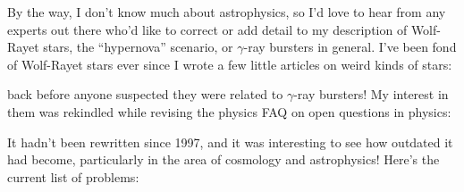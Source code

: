 \documentclass{article}
\def\tightlist{}
\renewcommand{\texttt}[1]{%
  \begingroup
  \ttfamily
  \begingroup\lccode`~=`/\lowercase{\endgroup\def~}{/\discretionary{}{}{}}%
  \begingroup\lccode`~=`[\lowercase{\endgroup\def~}{[\discretionary{}{}{}}%
  \begingroup\lccode`~=`.\lowercase{\endgroup\def~}{.\discretionary{}{}{}}%
  \catcode`/=\active\catcode`[=\active\catcode`.=\active
  \scantokens{#1\noexpand}%
  \endgroup
}
\begin{document}
By the way, I don't know much about astrophysics, so I'd love to hear
from any experts out there who'd like to correct or add detail to my
description of Wolf-Rayet stars, the ``hypernova'' scenario, or
\(\gamma\)-ray bursters in general. I've been fond of Wolf-Rayet stars
ever since I wrote a few little articles on weird kinds of stars:


back before anyone suspected they were related to \(\gamma\)-ray
bursters! My interest in them was rekindled while revising the physics
FAQ on open questions in physics:


It hadn't been rewritten since 1997, and it was interesting to see how
outdated it had become, particularly in the area of cosmology and
astrophysics! Here's the current list of problems:
\end{document}
